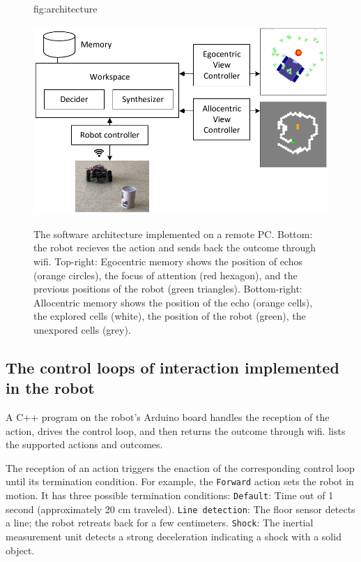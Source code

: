 \documentclass[pmlr]{jmlr}%
\begin{document}
\begin{figure}[htbp]
	\floatconts
	{fig:architecture}
	{\caption{The software architecture implemented on a remote PC. 
			Bottom: the robot recieves the action and sends back the outcome through wifi.
			Top-right: Egocentric memory shows the position of echos (orange circles), the focus of attention (red hexagon), and the previous positions of the robot (green triangles).
			Bottom-right: Allocentric memory shows the position of the echo (orange cells), the explored cells (white), the position of the robot (green), the unexpored cells (grey).}}
	{\includegraphics[width=0.8\linewidth]{images/Figure_2_Architecture}}
\end{figure}


\subsection{The control loops of interaction implemented in the robot}

A C++ program on the robot's Arduino board handles the reception of the action, drives the control loop, and then returns the outcome through wifi. 
 lists the supported actions and outcomes.

The reception of an action triggers the enaction of the corresponding control loop until its termination condition.
For example, the \texttt{Forward} action sets the robot in motion. 
It has three possible termination conditions: 
\texttt{Default}: Time out of 1 second (approximately 20 cm traveled).
\texttt{Line detection}: The floor sensor detects a line; the robot retreats back for a few centimeters. 
\texttt{Shock}: The inertial measurement unit detects a strong deceleration indicating a shock with a solid object.
\end{document}
